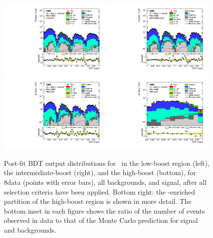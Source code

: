 \documentclass[11pt,twoside,a4paper,cmspaper,final,collab]{cms-tdr}
\begin{document}
\begin{figure}[htbp]
\centering
\includegraphics[width=0.49\textwidth]{BDT_Wln_ch1_Wenu_PostFit_s.pdf}
\includegraphics[width=0.49\textwidth]{BDT_Wln_ch1_Wenu2_PostFit_s.pdf}
\includegraphics[width=0.49\textwidth]{BDT_Wln_ch1_Wenu3_PostFit_s.pdf}
\includegraphics[width=0.49\textwidth]{BDT_Wln_Last_ch1_Wenu3_PostFit_s.pdf}
   \caption{Post-fit BDT output distributions for \WenH\ in the
    low-boost region (left),  the intermediate-boost (right), and the
    high-boost  (bottom), for 8\TeV data (points with error bars),
    all backgrounds, and signal, after all selection criteria have been
    applied.  Bottom right: the \VH-enriched partition of the high-boost region
    is shown in more detail. The bottom inset in each
      figure shows the ratio of the number of events observed in data to that
      of the Monte Carlo prediction for signal and backgrounds.}
    \label{fig:BDTWln8TeV_e}
\end{figure}
\end{document}
